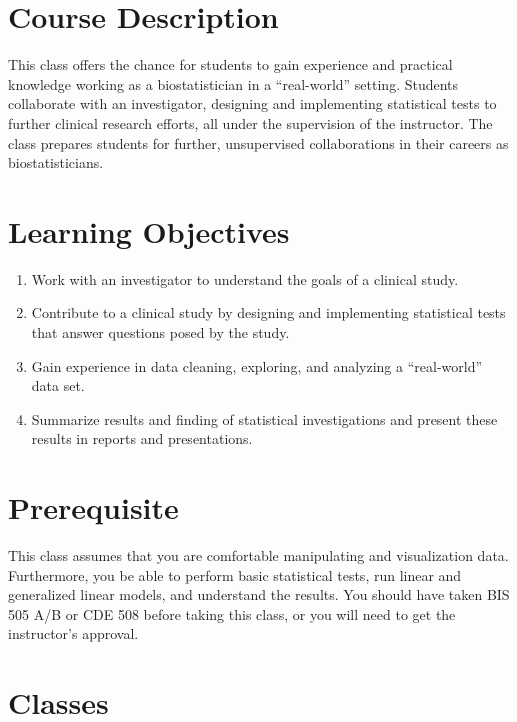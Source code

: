 \documentclass[12pt]{article}
\begin{document}
\begin{raggedright}
\parindent=0.5in


\section{Course Description}

This class offers the chance for students to gain experience and practical
knowledge working as a biostatistician in a ``real-world'' setting.  Students
collaborate with an investigator, designing and implementing statistical tests
to further clinical research efforts, all under the supervision of the
instructor.  The class prepares students for further, unsupervised 
collaborations in their careers as biostatisticians.

\section{Learning Objectives}

\begin{enumerate}
\item Work with an investigator to understand the goals of a clinical study.
\item Contribute to a clinical study by designing and implementing statistical
  tests that answer questions posed by the study.
\item Gain experience in data cleaning, exploring, and analyzing a 
  ``real-world'' data set.
\item Summarize results and finding of statistical investigations and present
  these results in reports and presentations.
\end{enumerate}

\section{Prerequisite}

This class assumes that you are comfortable manipulating and visualization
data.  Furthermore, you be able to perform basic statistical tests,
run linear and generalized linear models, and understand the results.
You should have taken BIS 505 A/B or CDE 508 before taking this class, or
you will need to get the instructor's approval.

\section{Classes}


\end{raggedright}
\end{document}
